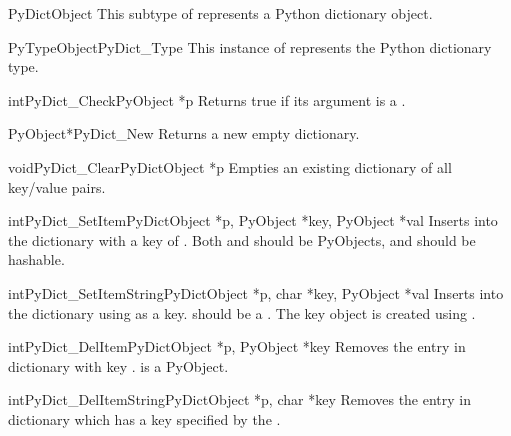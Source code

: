 \documentclass{manual}
\begin{document}
\begin{ctypedesc}{PyDictObject}
This subtype of  represents a Python dictionary object.
\end{ctypedesc}

\begin{cvardesc}{PyTypeObject}{PyDict_Type}
This instance of  represents the Python dictionary type.
\end{cvardesc}

\begin{cfuncdesc}{int}{PyDict_Check}{PyObject *p}
Returns true if its argument is a .
\end{cfuncdesc}

\begin{cfuncdesc}{PyObject*}{PyDict_New}{}
Returns a new empty dictionary.
\end{cfuncdesc}

\begin{cfuncdesc}{void}{PyDict_Clear}{PyDictObject *p}
Empties an existing dictionary of all key/value pairs.
\end{cfuncdesc}

\begin{cfuncdesc}{int}{PyDict_SetItem}{PyDictObject *p,
            PyObject *key,
            PyObject *val}
Inserts  into the dictionary with a key of .  Both
 and  should be PyObjects, and  should be
hashable.
\end{cfuncdesc}

\begin{cfuncdesc}{int}{PyDict_SetItemString}{PyDictObject *p,
            char *key,
            PyObject *val}
Inserts  into the dictionary using 
as a key.  should be a .  The key object is
created using .
\end{cfuncdesc}

\begin{cfuncdesc}{int}{PyDict_DelItem}{PyDictObject *p, PyObject *key}
Removes the entry in dictionary  with key .
 is a PyObject.
\end{cfuncdesc}

\begin{cfuncdesc}{int}{PyDict_DelItemString}{PyDictObject *p, char *key}
Removes the entry in dictionary  which has a key
specified by the .
\end{cfuncdesc}
\end{document}
